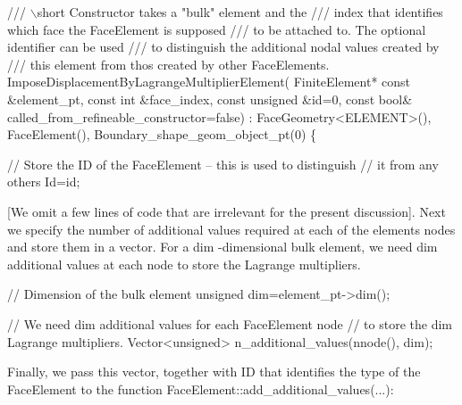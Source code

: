  
\begin{DoxyCodeInclude}
 \textcolor{comment}{/// \(\backslash\)short Constructor takes a "bulk" element and the }
\textcolor{comment}{ /// index that identifies which face the FaceElement is supposed}
\textcolor{comment}{}\textcolor{comment}{ /// to be attached to. The optional identifier can be used}
\textcolor{comment}{}\textcolor{comment}{ /// to distinguish the additional nodal values created by }
\textcolor{comment}{}\textcolor{comment}{ /// this element from thos created by other FaceElements.}
\textcolor{comment}{}  ImposeDisplacementByLagrangeMultiplierElement(
   FiniteElement* \textcolor{keyword}{const} &element\_pt, 
   \textcolor{keyword}{const} \textcolor{keywordtype}{int} &face\_index, 
   \textcolor{keyword}{const} \textcolor{keywordtype}{unsigned} &\textcolor{keywordtype}{id}=0,
   \textcolor{keyword}{const} \textcolor{keywordtype}{bool}& called\_from\_refineable\_constructor=\textcolor{keyword}{false}) : 
 FaceGeometry<ELEMENT>(), FaceElement(), Boundary\_shape\_geom\_object\_pt(0)
  \{   

   \textcolor{comment}{//  Store the ID of the FaceElement -- this is used to distinguish}
   \textcolor{comment}{// it from any others}
   Id=id;

\end{DoxyCodeInclude}


\mbox{[}We omit a few lines of code that are irrelevant for the present discussion\mbox{]}. Next we specify the number of additional values required at each of the element\textquotesingle{}s nodes and store them in a vector. For a {\ttfamily dim} -\/dimensional bulk element, we need {\ttfamily dim} additional values at each node to store the Lagrange multipliers.


\begin{DoxyCodeInclude}
   \textcolor{comment}{// Dimension of the bulk element}
   \textcolor{keywordtype}{unsigned} dim=element\_pt->dim();
 
   \textcolor{comment}{// We need dim additional values for each FaceElement node}
   \textcolor{comment}{// to store the dim Lagrange multipliers.}
   Vector<unsigned> n\_additional\_values(nnode(), dim);

\end{DoxyCodeInclude}


Finally, we pass this vector, together with ID that identifies the type of the {\ttfamily Face\+Element} to the function {\ttfamily Face\+Element\+::add\+\_\+additional\+\_\+values}(...)\+:


